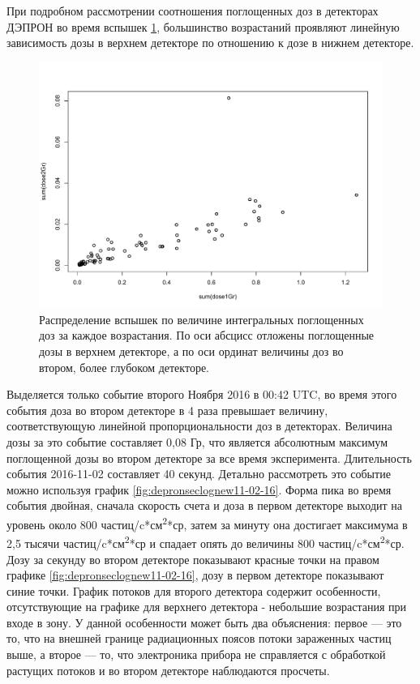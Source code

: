 При подробном рассмотрении соотношения поглощенных доз в детекторах ДЭПРОН во время вспышек \ref{fig:rplot03}, большинство возрастаний проявляют линейную зависимость дозы в верхнем детекторе по отношению к дозе в нижнем детекторе.
\begin{figure}
	\centering
	\includegraphics[width=0.7\linewidth]{images/Flash/Rplot03}
	\caption{Распределение вспышек по величине интегральных поглощенных доз за каждое возрастания. По оси абсцисс отложены поглощенные дозы в верхнем детекторе, а по оси ординат величины доз во втором, более глубоком детекторе.}
	\label{fig:rplot03}
\end{figure} 
Выделяется только событие второго Ноября 2016 в 00:42 UTC, во время этого события доза во втором детекторе в 4 раза превышает величину, соответствующую линейной пропорциональности доз в детекторах. Величина дозы за это событие составляет 0,08 Гр, что является абсолютным максимум поглощенной дозы во втором детекторе за все время эксперимента. Длительность события 2016-11-02 составляет 40 секунд. Детально рассмотреть это событие можно используя график 	\ref{fig:depronseclognew11-02-16}. Форма пика во время события двойная, сначала скорость счета и доза в первом детекторе выходит на уровень около 800 частиц/c*см\textsuperscript{2}*ср, затем за минуту она достигает максимума в 2,5 тысячи частиц/c*см\textsuperscript{2}*ср и спадает опять до величины 800 частиц/c*см\textsuperscript{2}*ср. Дозу за секунду во втором детекторе показывают красные точки на правом графике \ref{fig:depronseclognew11-02-16}, дозу в первом детекторе показывают синие точки. График потоков для второго детектора содержит особенности, отсутствующие на графике для верхнего детектора - небольшие возрастания при входе в зону. У данной особенности может быть два объяснения: первое --- это то, что на внешней границе радиационных поясов потоки зараженных частиц выше, а второе --- то, что электроника прибора не справляется с обработкой растущих потоков и во втором детекторе наблюдаются просчеты. 
